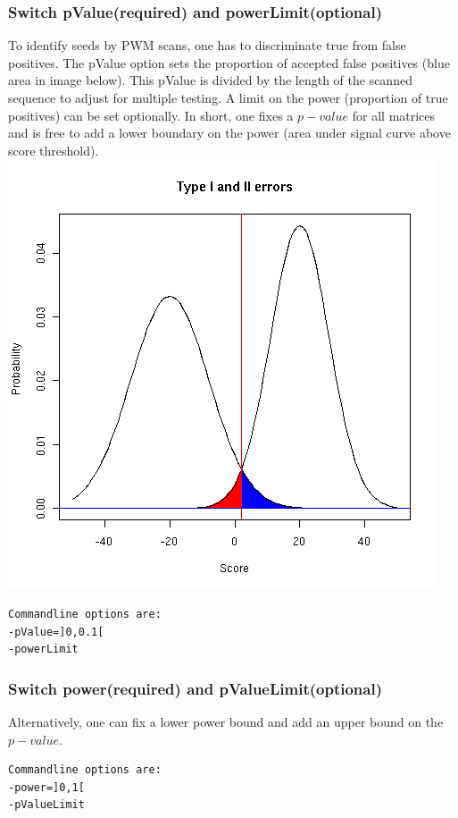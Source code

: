 \documentclass{article}
\begin{document}
\subsubsection*{Switch pValue(required) and powerLimit(optional)}
To identify seeds by PWM scans, one has to discriminate true from false positives. The pValue option sets the proportion of accepted false positives (blue area in image below). This pValue is divided by the length of the scanned sequence to adjust for multiple testing. A limit on the power (proportion of true positives) can be set optionally. In short, one fixes a $p-value$ for all matrices and is free to add a lower boundary on the power (area under signal curve above score threshold).\\
\includegraphics{typeIandII}
\begin{verbatim}
Commandline options are:
-pValue=]0,0.1[
-powerLimit
\end{verbatim}
\subsubsection*{Switch power(required) and pValueLimit(optional)}
Alternatively, one can fix a lower power bound and add an upper bound on the $p-value$.
\begin{verbatim}
Commandline options are:
-power=]0,1[
-pValueLimit
\end{verbatim}
\end{document}
